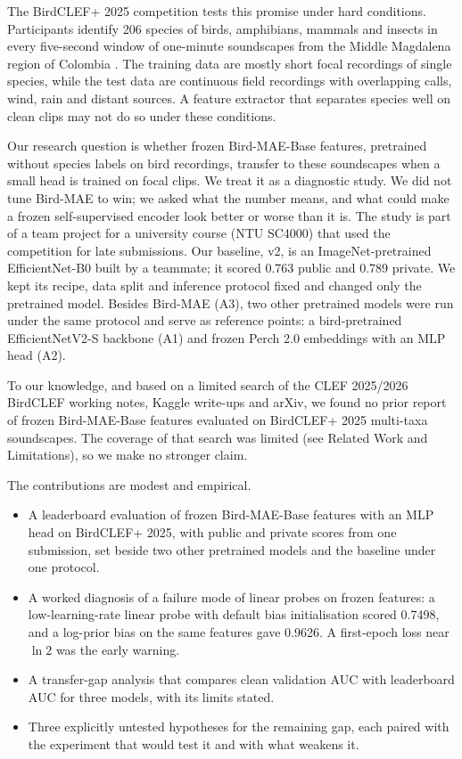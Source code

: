 \documentclass[letterpaper]{article} %
\begin{document}
The BirdCLEF+ 2025 competition tests this promise under hard conditions. Participants identify 206 species of birds, amphibians, mammals and insects in every five-second window of one-minute soundscapes from the Middle Magdalena region of Colombia \citep{canas2025birdclef}. The training data are mostly short focal recordings of single species, while the test data are continuous field recordings with overlapping calls, wind, rain and distant sources. A feature extractor that separates species well on clean clips may not do so under these conditions.

Our research question is whether frozen Bird-MAE-Base features, pretrained without species labels on bird recordings, transfer to these soundscapes when a small head is trained on focal clips. We treat it as a diagnostic study. We did not tune Bird-MAE to win; we asked what the number means, and what could make a frozen self-supervised encoder look better or worse than it is. The study is part of a team project for a university course (NTU SC4000) that used the competition for late submissions. Our baseline, v2, is an ImageNet-pretrained EfficientNet-B0 built by a teammate; it scored 0.763 public and 0.789 private. We kept its recipe, data split and inference protocol fixed and changed only the pretrained model. Besides Bird-MAE (A3), two other pretrained models were run under the same protocol and serve as reference points: a bird-pretrained EfficientNetV2-S backbone (A1) and frozen Perch 2.0 embeddings with an MLP head (A2).

To our knowledge, and based on a limited search of the CLEF 2025/2026 BirdCLEF working notes, Kaggle write-ups and arXiv, we found no prior report of frozen Bird-MAE-Base features evaluated on BirdCLEF+ 2025 multi-taxa soundscapes. The coverage of that search was limited (see Related Work and Limitations), so we make no stronger claim.

The contributions are modest and empirical.
\begin{itemize}
\item A leaderboard evaluation of frozen Bird-MAE-Base features with an MLP head on BirdCLEF+ 2025, with public and private scores from one submission, set beside two other pretrained models and the baseline under one protocol.
\item A worked diagnosis of a failure mode of linear probes on frozen features: a low-learning-rate linear probe with default bias initialisation scored 0.7498, and a log-prior bias on the same features gave 0.9626. A first-epoch loss near $\ln 2$ was the early warning.
\item A transfer-gap analysis that compares clean validation AUC with leaderboard AUC for three models, with its limits stated.
\item Three explicitly untested hypotheses for the remaining gap, each paired with the experiment that would test it and with what weakens it.
\end{itemize}
\end{document}

